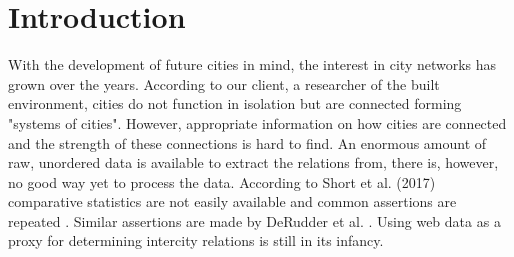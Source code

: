 \chapter{Introduction}
With the development of future cities in mind, the interest in city networks has grown over the years. According to our client, a researcher of the built environment, cities do not function in isolation but are connected forming "systems of cities". However, appropriate information on how cities are connected and the strength of these connections is hard to find. An enormous amount of raw, unordered data is available to extract the relations from, there is, however, no good way yet to process the data. According to Short et al. (2017) comparative statistics are not easily available and common assertions are repeated \cite{short1996dirty}. Similar assertions are made by DeRudder et al. \cite{derudder2005appraisal}. Using web data as a proxy for determining intercity relations is still in its infancy.

